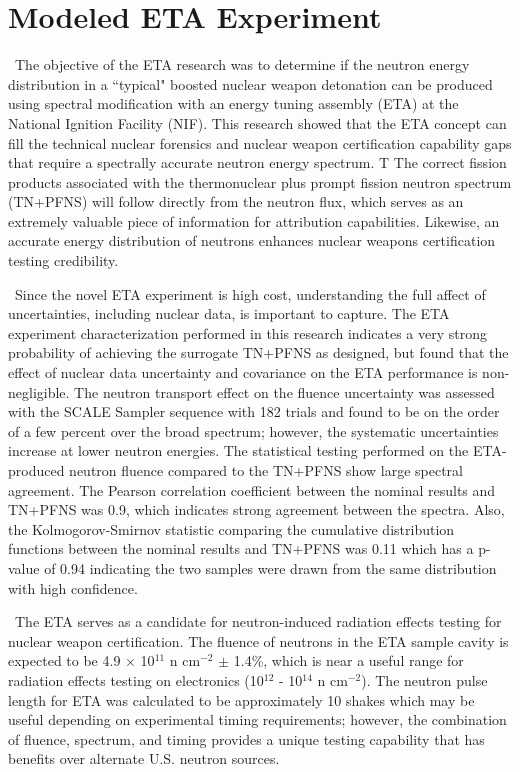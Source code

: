 \section{Modeled ETA Experiment}
\ The objective of the ETA research was to determine if the neutron energy distribution in a ``typical" boosted nuclear weapon detonation can be produced using spectral modification with an energy tuning assembly (ETA) at the National Ignition Facility (NIF). 
This research showed that the ETA concept can fill the technical nuclear forensics and nuclear weapon certification capability gaps that require a spectrally accurate neutron energy spectrum. T 
The correct fission products associated with the thermonuclear plus prompt fission neutron spectrum (TN+PFNS) will follow directly from the neutron flux, which serves as an extremely valuable piece of information for attribution capabilities.
Likewise, an accurate energy distribution of neutrons enhances nuclear weapons certification testing credibility.

\ Since the novel ETA experiment is high cost, understanding the full affect of uncertainties, including nuclear data, is important to capture.
The ETA experiment characterization performed in this research indicates a very strong probability of achieving the surrogate TN+PFNS as designed, but found that the effect of nuclear data uncertainty and covariance on the ETA performance is non-negligible. 
The neutron transport effect on the fluence uncertainty was assessed with the SCALE Sampler sequence with 182 trials and found to be on the order of a few percent over the broad spectrum; however, the systematic uncertainties increase at lower neutron energies.
The statistical testing performed on the ETA-produced neutron fluence compared to the TN+PFNS show large spectral agreement. 
The Pearson correlation coefficient between the nominal results and TN+PFNS was 0.9, which indicates strong agreement between the spectra. 
Also, the Kolmogorov-Smirnov statistic comparing the cumulative distribution functions between the nominal results and TN+PFNS was 0.11 which has a p-value of 0.94 indicating the two samples were drawn from the same distribution with high confidence.  

\ The ETA serves as a candidate for neutron-induced radiation effects testing for nuclear weapon certification. 
The fluence of neutrons in the ETA sample cavity is expected to be 4.9 $\times$ 10$^{11}$ n cm$^{-2}$ $\pm$ 1.4\%, which is near a useful range for radiation effects testing on electronics (10$^{12}$ - 10$^{14}$ n cm$^{-2}$). 
The neutron pulse length for ETA was calculated to be approximately 10 shakes which may be useful depending on experimental timing requirements; however, the combination of fluence, spectrum, and timing provides a unique testing capability that has benefits over alternate U.S. neutron sources.  

